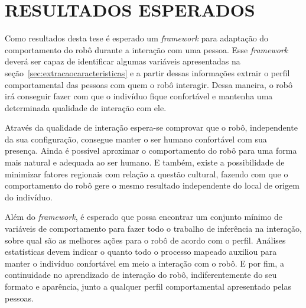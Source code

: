 \chapter{RESULTADOS ESPERADOS}
\label{cap:resultados}
Como resultados desta tese é esperado um \emph{framework} para adaptação do comportamento do robô durante a interação com uma pessoa. Esse \emph{framework} deverá ser capaz de identificar algumas variáveis apresentadas na seção~\ref{sec:extracaocaracteristicas} e a partir dessas informações extrair o perfil comportamental das pessoas com quem o robô interagir. Dessa maneira, o robô irá conseguir fazer com que o indivíduo fique confortável e mantenha uma determinada qualidade de interação com ele. 

Através da qualidade de interação espera-se comprovar que o robô, independente da sua configuração, consegue manter o ser humano confortável com sua presença. Ainda é possível aproximar o comportamento do robô para uma forma mais natural e adequada ao ser humano. E também, existe a possibilidade de minimizar fatores regionais com relação a questão cultural, fazendo com que o comportamento do robô gere o mesmo resultado independente do local de origem do indivíduo.

Além do \emph{framework}, é esperado que possa encontrar um conjunto mínimo de variáveis de comportamento para fazer todo o trabalho de inferência na interação, sobre qual são as melhores ações para o robô de acordo com o perfil. Análises estatísticas devem indicar o quanto todo o processo mapeado auxiliou para manter o indivíduo confortável em meio a interação com o robô. E por fim, a continuidade no aprendizado de interação do robô, indiferentemente do seu formato e aparência, junto a qualquer perfil comportamental apresentado pelas pessoas.